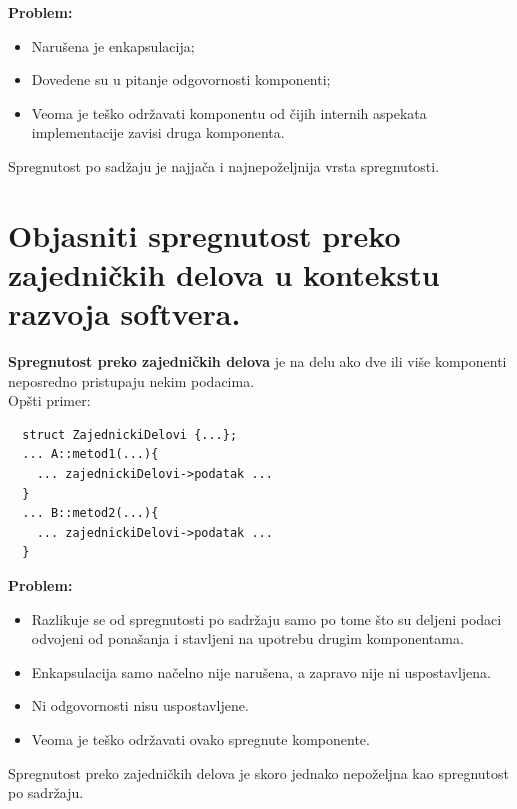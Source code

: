\documentclass[a4paper]{article}
\begin{document}
  \noindent \textbf{Problem:}
  \begin{itemize}
    \item Narušena je enkapsulacija;
    \item Dovedene su u pitanje odgovornosti komponenti;
    \item Veoma je teško održavati komponentu od čijih internih aspekata implementacije
          zavisi druga komponenta.
  \end{itemize} 
  Spregnutost po sadžaju je najjača i najnepoželjnija vrsta spregnutosti.

\section{Objasniti spregnutost preko zajedničkih delova u kontekstu razvoja softvera.}
  \textbf{Spregnutost preko zajedničkih delova} je na delu ako dve ili više komponenti
  neposredno pristupaju nekim podacima. \\
  Opšti primer:
\begin{lstlisting}
  struct ZajednickiDelovi {...};
  ... A::metod1(...){
    ... zajednickiDelovi->podatak ...
  }
  ... B::metod2(...){
    ... zajednickiDelovi->podatak ...
  }\end{lstlisting}
  \textbf{Problem:} 
  \begin{itemize}
    \item Razlikuje se od spregnutosti po sadržaju samo po tome što su deljeni podaci
          odvojeni od ponašanja i stavljeni na upotrebu drugim komponentama.
    \item Enkapsulacija samo načelno nije narušena, a zapravo nije ni uspostavljena.
    \item Ni odgovornosti nisu uspostavljene.
    \item Veoma je teško održavati ovako spregnute komponente.
  \end{itemize}
  Spregnutost preko zajedničkih delova je skoro jednako nepoželjna kao spregnutost
  po sadržaju.
\end{document}
